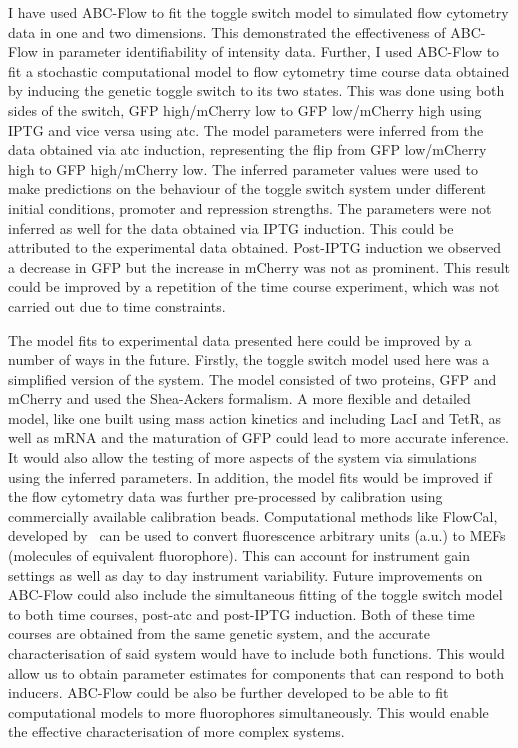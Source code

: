 I have used ABC-Flow to fit the toggle switch model to simulated flow cytometry data in one and two dimensions. This demonstrated the effectiveness of ABC-Flow in parameter identifiability of intensity data. Further, I used ABC-Flow to fit a stochastic computational model to flow cytometry time course data obtained by inducing the genetic toggle switch to its two states. This was done using both sides of the switch, GFP high/mCherry low to GFP low/mCherry high using IPTG and vice versa using \acrshort{atc}. The model parameters were inferred from the data obtained via \acrshort{atc} induction, representing the flip from GFP low/mCherry high to GFP high/mCherry low. The inferred parameter values were used to make predictions on the behaviour of the toggle switch system under different initial conditions, promoter and repression strengths. The parameters were not inferred as well for the data obtained via IPTG induction. This could be attributed to the experimental data obtained. Post-IPTG induction we observed a decrease in GFP but the increase in mCherry was not as prominent. This result could be improved by a repetition of the time course experiment, which was not carried out due to time constraints.


The model fits to experimental data presented here could be improved by a number of ways in the future. Firstly, the toggle switch model used here was a simplified version of the system. The model consisted of two proteins, GFP and mCherry and used the Shea-Ackers formalism. A more flexible and detailed model, like one built using mass action kinetics and including LacI and TetR, as well as mRNA and the maturation of GFP could lead to more accurate inference. It would also allow the testing of more aspects of the system via simulations using the inferred parameters. In addition, the model fits would be improved if the flow cytometry data was further pre-processed by calibration using commercially available calibration beads. Computational methods like FlowCal, developed by~\textcite{Tabor:2009bz} can be used to convert fluorescence arbitrary units (a.u.) to MEFs (molecules of equivalent fluorophore). This can account for instrument gain settings as well as day to day instrument variability. Future improvements on ABC-Flow could also include the simultaneous fitting of the toggle switch model to both time courses, post-\acrshort{atc} and post-IPTG induction. Both of these time courses are obtained from the same genetic system, and the accurate characterisation of said system would have to include both functions. This would allow us to obtain parameter estimates for components that can respond to both inducers. ABC-Flow could be also be further developed to be able to fit computational models to more fluorophores simultaneously. This would enable the effective characterisation of more complex systems.

